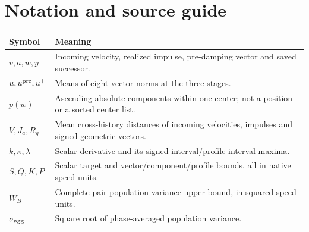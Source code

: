 \documentclass[11pt,a4paper]{article}
\begin{document}
\clearpage
\section*{Notation and source guide}
\begin{center}\begin{tabular}{lp{.72\linewidth}}\toprule
Symbol & Meaning\\\midrule
$v,a,w,y$ & Incoming velocity, realized impulse, pre-damping vector and saved successor.\\
$u,u^{\rm pre},u^+$ & Means of eight vector norms at the three stages.\\
$p(w)$ & Ascending absolute components within one center; not a position or a sorted center list.\\
$V,J_a,R_g$ & Mean cross-history distances of incoming velocities, impulses and signed geometric vectors.\\
$k,\kappa,\lambda$ & Scalar derivative and its signed-interval/profile-interval maxima.\\
$S,Q,K,P$ & Scalar target and vector/component/profile bounds, all in native speed units.\\
$W_B$ & Complete-pair population variance upper bound, in squared-speed units.\\
$\sigma_{\rm agg}$ & Square root of phase-averaged population variance.\\\bottomrule
\end{tabular}\end{center}
\end{document}
